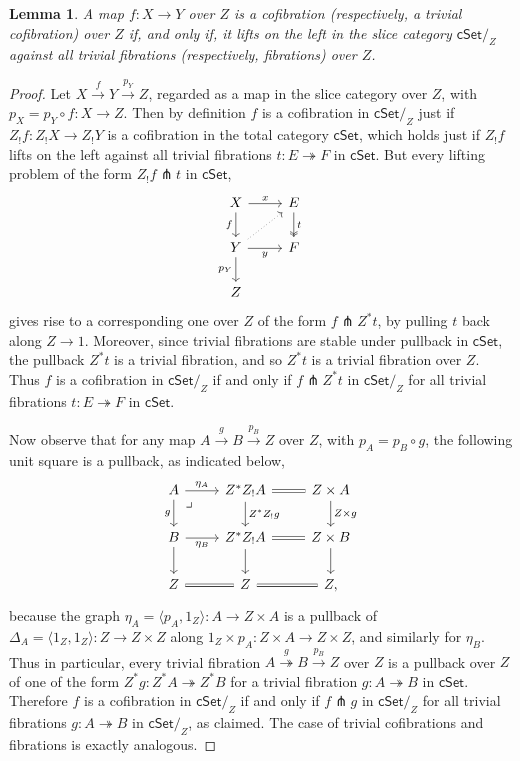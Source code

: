 \documentclass[11pt,reqno]{amsart}
\newcommand{\cSet}{\ensuremath{\mathsf{cSet}}}
\newcommand{\cSetZ}{\ensuremath{\mathsf{cSet}/_{\!Z}}}
\newcommand{\fib}{\ensuremath{\twoheadrightarrow}}
\renewcommand{\to}{\ensuremath{\rightarrow}}
\newcommand{\too}{\ensuremath{\longrightarrow}}
\newcommand{\pair}[1]{\ensuremath{\langle #1\rangle}}
\newtheorem{lemma}[theorem]{Lemma}
\theoremstyle{remark}
\theoremstyle{definition}
\newcommand{\pbmark}{\ar[dr, phantom, "\lrcorner" very near start, shift right=.5ex]}	%
\begin{document}
\begin{lemma}\label{lem:slicepremodellifting2}
A map $f : X \to Y$ over $Z$  is a cofibration (respectively, a trivial cofibration) over $Z$ if, and only if, it lifts on the left in the slice category $\cSetZ$ against all trivial fibrations (respectively, fibrations) over $Z$.
\end{lemma}
%
\begin{proof}
Let $X \stackrel{f}{\to} Y \stackrel{p_Y}{\too} Z$, regarded as a map in the slice category over $Z$, with $p_X = p_Y \circ f : X \to Z$.  Then by definition $f$ is a cofibration in $\cSetZ$ just if $Z_! f : Z_! X\to Z_! Y$ is a cofibration in the total category $\cSet$, which holds just if $Z_! f$ lifts on the left against all trivial fibrations $t : E \fib F$ in $\cSet$.  
But every lifting problem of the form $Z_! f\pitchfork t$ in $\cSet$,
\[\begin{tikzcd}
X \ar[d,swap, "f"] \ar[r, "x" ] & E \ar[d, two heads, "t"] \\  
Y  \ar[r, swap, "y" ] \ar[ru, dotted] \ar[d,swap, "{p_Y}"] & F  \\
Z &
 \end{tikzcd}\]
gives rise to a corresponding one over $Z$ of the form $f\pitchfork Z^*t$, by pulling $t$ back along $Z \to 1$. Moreover, since trivial fibrations are stable under pullback in $\cSet$, the pullback $Z^*t$ is a trivial fibration, and so $Z^*t$ is a trivial fibration over $Z$.  Thus $f$ is a cofibration in $\cSetZ$ if and only if $f\pitchfork Z^*t$ in $\cSetZ$ for all trivial fibrations $t : E\fib F$ in $\cSet$.  

Now observe that for any map $A \stackrel{g}{\to} B \stackrel{p_B}{\too} Z$ over $Z$, with $p_A = p_B\circ g$, the following unit square is a pullback, as indicated below,
\begin{equation}\label{eq:unitgraphpullback}
\begin{tikzcd}
A \ar[d,swap, "g"] \ar[r, "\eta_A" ] \pbmark & Z^*Z_!A  \ar[d, "Z^*Z_!g"] \ar[r, equals] & Z\times A \ar[d, "Z\times g"] \\  
B  \ar[r, swap, "\eta_B" ]   \ar[d] & Z^*Z_!A   \ar[d] \ar[r, equals] & Z\times B  \ar[d] \\
Z  \ar[r, equals] & Z  \ar[r, equals] & Z,
 \end{tikzcd}
 \end{equation}
because the graph $\eta_A = \pair{p_A, 1_Z} : A \to Z\times A$ is a pullback of $\Delta_A = \pair{1_Z, 1_Z} : Z \to Z\times Z$ along $1_Z \times p_A : Z\times A \to Z\times Z$, and similarly for $\eta_B$.  Thus in particular, every trivial fibration $A \stackrel{g}{\fib} B \stackrel{p_B}{\too} Z$ over $Z$ is a pullback over $Z$ of one of the form $Z^*g : Z^*A \fib Z^*B$ for a trivial fibration $g : A\fib B$ in $\cSet$.  Therefore $f$ is a cofibration in $\cSetZ$ if and only if $f\pitchfork g$ in $\cSetZ$ for all trivial fibrations $g : A\fib B$ in $\cSetZ$, as claimed. 
The case of trivial cofibrations and fibrations is exactly analogous.
\end{proof}
\end{document}
